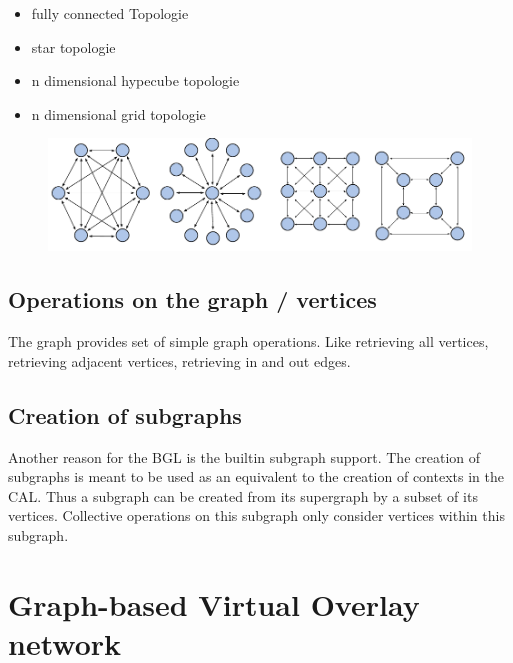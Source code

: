 \begin{itemize}
\item fully connected Topologie
\item star topologie
\item n dimensional hypecube topologie
\item n dimensional grid topologie
\end{itemize}

\begin{figure}[H]
  \centering
  \includegraphics[width=\textwidth]{graphics/40_topologies}
  \caption{}
  \label{fig:topologies}
\end{figure}



\subsection{Operations on the graph / vertices}
The graph provides set of simple graph operations. Like retrieving all
vertices, retrieving adjacent vertices, retrieving in and out edges.

\subsection{Creation of subgraphs}
Another reason for the BGL is the builtin subgraph support. The
creation of subgraphs is meant to be used as an equivalent to the
creation of contexts in the CAL. Thus a subgraph can be created from
its supergraph by a subset of its vertices. Collective operations on
this subgraph only consider vertices within this subgraph.

\section{Graph-based Virtual Overlay network}

